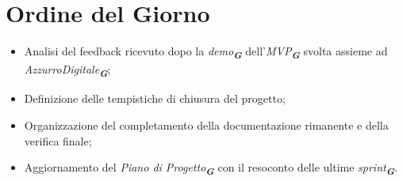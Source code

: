 

\section{Ordine del Giorno}

\begin{itemize}
    \item Analisi del feedback ricevuto dopo la \emph{demo}\textsubscript{\textit{\textbf{G}}} dell'\emph{MVP}\textsubscript{\textit{\textbf{G}}} svolta assieme ad \emph{AzzurroDigitale}\textsubscript{\textit{\textbf{G}}};
    
    \item Definizione delle tempistiche di chiusura del progetto;

    \item Organizzazione del completamento della documentazione rimanente e della verifica finale;
    
    \item Aggiornamento del \emph{Piano di Progetto}\textsubscript{\textit{\textbf{G}}} con il resoconto delle ultime \emph{sprint}\textsubscript{\textit{\textbf{G}}}.
\end{itemize}
    